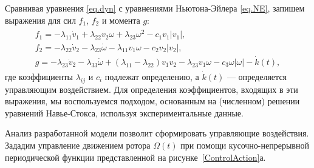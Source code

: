 Сравнивая уравнения \eqref{eq.dyn} с уравнениями Ньютона-Эйлера \eqref{eq.NE}, запишем выражения для сил $f_1$, $f_2$ и момента $g$:
\begin{gather}
\begin{gathered}\label{eq.forceTorque}
f_1 = - \lambda_{11}\dot{v}_1 + \lambda_{22} v_2 \omega + \lambda_{23}\omega^2 - c_1 v_1 |v_1|, \\
f_2 = - \lambda_{22} \dot{v}_2 - \lambda_{23} \dot{\omega} - \lambda_{11} v_1 \omega - c_2 v_2 |v_2|,\\
g = -\lambda_{23}\dot{v}_2 - \lambda_{33} \dot{\omega} + (\lambda_{11} - \lambda_{22}) v_1 v_2 - \lambda_{23} v_1\omega - c_3 \omega |\omega| - \dot{k}(t),
\end{gathered}
\end{gather}
где коэффициенты $\lambda_{ij}$ и $c_i$ подлежат определению, а $\dot{k}(t)$ --- определяется управляющим воздействием. Для определения коэффициентов, входящих в эти выражения, мы воспользуемся подходом, основанным на (численном) решении уравнений Навье-Стокса, используя экспериментальные данные.

Анализ разработанной модели позволит сформировать управляющие воздействия. Зададим управление движением ротора $\Omega(t)$  при помощи кусочно-непрерывной периодической функции представленной на рисунке~\ref{ControlAction}а.


